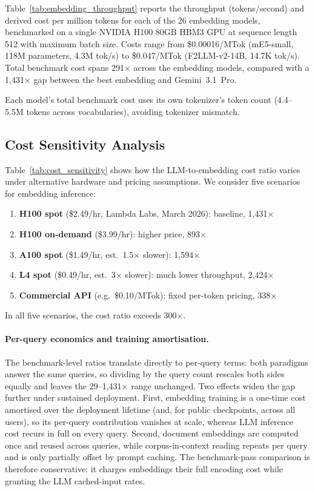 Table~\ref{tab:embedding_throughput} reports the throughput (tokens/second) and derived cost per million tokens for each of the 26 embedding models, benchmarked on a single NVIDIA H100 80GB HBM3 GPU at sequence length 512 with maximum batch size.
Costs range from \$0.00016/MTok (mE5-small, 118M parameters, 4.3M tok/s) to \$0.047/MTok (F2LLM-v2-14B, 14.7K tok/s).
Total benchmark cost spans 291$\times$ across the embedding models, compared with a 1{,}431$\times$ gap between the best embedding and Gemini~3.1~Pro.

Each model's total benchmark cost uses its own tokenizer's token count (4.4--5.5M tokens across vocabularies), avoiding tokenizer mismatch.



\subsection{Cost Sensitivity Analysis}
\label{app:cost_sensitivity}

Table~\ref{tab:cost_sensitivity} shows how the LLM-to-embedding cost ratio varies under alternative hardware and pricing assumptions.
We consider five scenarios for embedding inference:
\begin{enumerate}
    \item \textbf{H100 spot} (\$2.49/hr, Lambda Labs, March 2026): baseline, 1{,}431$\times$
    \item \textbf{H100 on-demand} (\$3.99/hr): higher price, 893$\times$
    \item \textbf{A100 spot} (\$1.49/hr, est.\ 1.5$\times$ slower): 1{,}594$\times$
    \item \textbf{L4 spot} (\$0.49/hr, est.\ 3$\times$ slower): much lower throughput, 2{,}424$\times$
    \item \textbf{Commercial API} (e.g.\ \$0.10/MTok): fixed per-token pricing, 338$\times$
\end{enumerate}
In all five scenarios, the cost ratio exceeds 300$\times$.



\paragraph{Per-query economics and training amortisation.}
The benchmark-level ratios translate directly to per-query terms: both paradigms answer the same queries, so dividing by the query count rescales both sides equally and leaves the 29--1{,}431$\times$ range unchanged.
Two effects widen the gap further under sustained deployment.
First, embedding training is a one-time cost amortised over the deployment lifetime (and, for public checkpoints, across all users), so its per-query contribution vanishes at scale, whereas LLM inference cost recurs in full on every query.
Second, document embeddings are computed once and reused across queries, while corpus-in-context reading repeats per query and is only partially offset by prompt caching.
The benchmark-pass comparison is therefore conservative: it charges embeddings their full encoding cost while granting the LLM cached-input rates.

